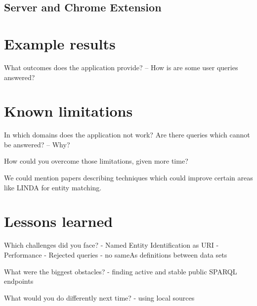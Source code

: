 \documentclass[11pt,titlepage,oneside,openany]{article}
\begin{document}
\subsection{Server and Chrome Extension}



\section{Example results}
What outcomes does the application provide? – How is are some user queries answered? 

\section{Known limitations}
In which domains does the application not work? 
Are there queries which cannot be answered? – Why? 

How could you overcome those limitations, given more time?

We could mention papers describing techniques which could improve certain areas like LINDA \cite{boehm_linda:_2012} for entity matching. 


\section{Lessons learned}
Which challenges did you face?
- Named Entity Identification as URI
- Performance
- Rejected queries
- no sameAs definitions between data sets


What were the biggest obstacles?
- finding active and stable public SPARQL endpoints


What would you do differently next time?
- using local sources
\pagebreak

  
%
\end{document}
